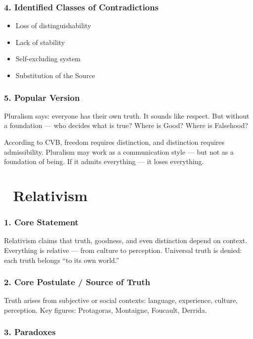 \documentclass[12pt]{article}
\begin{document}
\subsubsection*{4. Identified Classes of Contradictions}

\begin{itemize}
\item Loss of distinguishability
\item Lack of stability
\item Self-excluding system
\item Substitution of the Source
\end{itemize}

\subsubsection*{5. Popular Version}

Pluralism says: everyone has their own truth. It sounds like respect. But without a foundation — who decides what is true? Where is Good? Where is Falsehood?

According to CVB, freedom requires distinction, and distinction requires admissibility. Pluralism may work as a communication style — but not as a foundation of being. If it admits everything — it loses everything.

\section*{🔷 Relativism}

\subsubsection*{1. Core Statement}

Relativism claims that truth, goodness, and even distinction depend on context. Everything is relative — from culture to perception. Universal truth is denied: each truth belongs ``to its own world.''

\subsubsection*{2. Core Postulate / Source of Truth}

Truth arises from subjective or social contexts: language, experience, culture, perception. Key figures: Protagoras, Montaigne, Foucault, Derrida.

\subsubsection*{3. Paradoxes}
\end{document}
